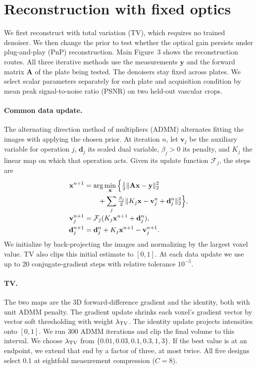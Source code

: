 \section{Reconstruction with fixed optics}
\label{sec:s:reconstruction}

We first reconstruct with total variation (TV), which requires no trained denoiser. We then change the prior to test whether the optical gain persists under plug-and-play (PnP) reconstruction. Main Figure~3 shows the reconstruction routes. All three iterative methods use the measurements $\mathbf y$ and the forward matrix $\mathbf A$ of the plate being tested. The denoisers stay fixed across plates. We select scalar parameters separately for each plate and acquisition condition by mean peak signal-to-noise ratio (PSNR) on two held-out vascular crops.

\paragraph{Common data update.}
The alternating direction method of multipliers (ADMM) alternates fitting the images with applying the chosen prior. At iteration $n$, let $\mathbf v_j$ be the auxiliary variable for operation $j$, $\mathbf d_j$ its scaled dual variable, $\beta_j>0$ its penalty, and $K_j$ the linear map on which that operation acts. Given its update function $\mathcal F_j$, the steps are
\begin{align}
\mathbf x^{n+1}&=\arg\min_{\mathbf x}
\Big\{\tfrac12\|\mathbf A\mathbf x-\mathbf y\|_2^2\notag\\
&\qquad+\sum_j\tfrac{\beta_j}{2}\|K_j\mathbf x-\mathbf v_j^n+\mathbf d_j^n\|_2^2\Big\},
\notag\\[-2pt]
\mathbf v_j^{n+1}&=\mathcal F_j(K_j\mathbf x^{n+1}+\mathbf d_j^n),\\
\mathbf d_j^{n+1}&=\mathbf d_j^n+K_j\mathbf x^{n+1}-\mathbf v_j^{n+1}.\notag
\end{align}
We initialize by back-projecting the images and normalizing by the largest voxel value. TV also clips this initial estimate to $[0,1]$. At each data update we use up to 20 conjugate-gradient steps with relative tolerance $10^{-5}$.

\paragraph{TV.}
The two maps are the 3D forward-difference gradient and the identity, both with unit ADMM penalty. The gradient update shrinks each voxel's gradient vector by vector soft thresholding with weight $\lambda_{\rm TV}$. The identity update projects intensities onto $[0,1]$. We run 300 ADMM iterations and clip the final volume to this interval. We choose $\lambda_{\rm TV}$ from $\{0.01,0.03,0.1,0.3,1,3\}$. If the best value is at an endpoint, we extend that end by a factor of three, at most twice. All five designs select 0.1 at eightfold measurement compression ($C=8$).

